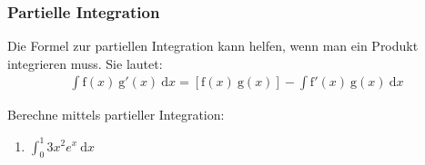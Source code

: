 \documentclass[11pt, a4paper]{article}
\newcommand\braces[1]{\left(#1\right)}
\newcommand\brackets[1]{\left[#1\right]}
\newcommand{\intend}[1][]{\ \mathrm{d}#1}
\newif\ifshowsolution
\begin{document}
\begin{enumerate}
	\ifshowsolution
		\begin{align*}
			\shortintertext{Substituiere: $3 \cos x = t$}
			\shortintertext{$\frac{\intend{t}}{\intend{x}} = -3 \sin x \Leftrightarrow \intend{x} = \frac{\intend{t}}{-3 \sin x}$}
			\int_\frac{\pi}{2}^\pi e^{3 \cos x} \cdot \sin x \intend{x} &= \int_{t\braces{\frac{\pi}{2}}}^{t\braces{\pi}} e^t \cdot \cancel{\sin x} \ \frac{\intend{t}}{-3 \ \cancel{\sin x}} \\
			&= \int_{t\braces{\frac{\pi}{2}}}^{t\braces{\pi}} e^t \frac{1}{-3} \intend{t} \\
			&= -\frac{1}{3} \int_{t\braces{\frac{\pi}{2}}}^{t\braces{\pi}} e^t\intend{t} \\
			&= -\frac{1}{3} \brackets{e^t}_{t\braces{\frac{\pi}{2}}}^{t\braces{\pi)}} \\
			&= -\frac{1}{3} \brackets{e^t}_{3 \cos(\frac{\pi}{2})}^{3 \cos(\pi)} \\
			&= -\frac{1}{3} \brackets{e^t}_0^{-3} \\
			&= -\frac{1}{3} \braces{e^{-3} - 1}
			\shortintertext{Oder: Rücksubstitution nach Integration}
			-\frac{1}{3} \left[ e^t \right]_{t(\frac{\pi}{2})}^{t(\pi)} &= -\frac{1}{3} \left[ e^{3 \cos x} \right]_{\frac{\pi}{2}}^\pi \\
			&= -\frac{1}{3} \braces{e^{3 \cos \pi} - e^{3 \cos \frac{\pi}{2}}} \\
			&= -\frac{1}{3} \braces{e^{-3} - 1}
		\end{align*}
	\fi
\end{enumerate}

\subsubsection{Partielle Integration}
Die Formel zur partiellen Integration kann helfen, wenn man ein Produkt integrieren muss. Sie lautet:
\begin{align*}
	\int \mathrm{f}(x) \ \mathrm{g}'(x) \intend{x} = \brackets{\mathrm{f}(x) \ \mathrm{g}(x)} - \int \mathrm{f}'(x) \ \mathrm{g}(x) \intend{x}
\end{align*}

Berechne mittels partieller Integration:
\begin{enumerate}
	\item $\int_0^1 3x^2 e^x \intend{x}$
	
	\ifshowsolution
		\begin{align*}
			\int_0^1 \underbrace{3x^2}_\mathrm{f} \underbrace{e^x}_\mathrm{g'} \intend{x} &= \brackets{3x^2 e^x}_0^1 - \int_0^1 \underbrace{6x}_\mathrm{f} \ \underbrace{e^x}_\mathrm{g'} \intend{x} \\
			&= \brackets{3x^2 e^x}_0^1 - \braces{ \brackets{6x \ e^x}_0^1 - \int_0^1 6 e^x \intend{x} } \\
			&= \brackets{3x^2 e^x}_0^1 - \brackets{6x \ e^x}_0^1 + 6 \int_0^1 e^x \intend{x} \\
			&= \brackets{3x^2 e^x}_0^1 - \brackets{6x \ e^x}_0^1 + 6 \brackets{e^x}_0^1 \\
			&= 3e - 6
		\end{align*}
	\fi
\end{enumerate}
\end{document}

